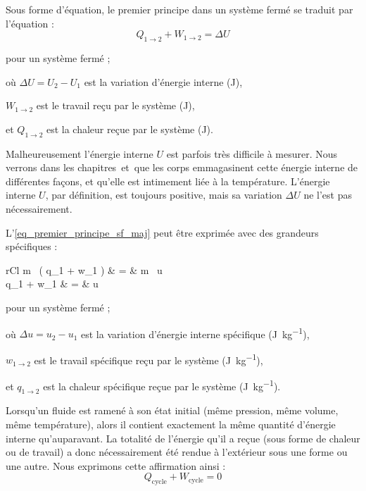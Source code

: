 	Sous forme d’équation, le premier principe dans un système fermé se traduit par l’équation :
	\begin{equation}
		Q_{1 \to 2} + W_{1 \to 2} = \Delta U
		\label{eq_premier_principe_sf_maj}
	\end{equation}

	\begin{equationterms}
		\item pour un système fermé ;
		\item où \tab $\Delta U = U_2 - U_1$ est la variation d’énergie interne (\si{\joule}),
		\item 	\tab $W_{1 \to 2}$ 	\tab est le travail reçu par le système (\si{\joule}),
		\item et \tab $Q_{1 \to 2}$ 	\tab est la chaleur reçue par le système (\si{\joule}).
	\end{equationterms}

	Malheureusement l’énergie interne $U$ est parfois très difficile à mesurer. Nous verrons dans les chapitres~\quatre et~\cinq que les corps emmagasinent cette énergie interne de différentes façons, et qu’elle est intimement liée à la température. L’énergie interne $U$, par définition, est toujours positive, mais sa variation $\Delta U$ ne l’est pas nécessairement.

	L’\cref{eq_premier_principe_sf_maj} peut être exprimée avec des grandeurs spécifiques :
	\begin{IEEEeqnarray}{rCl}
		m \ ( q_{1 } + w_{1 } )		& = & m \ \Delta u  \nonumber \\
		q_{1 } + w_{1 } 				& = & \Delta u
	\label{eq_premier_principe_sf_min}
	\end{IEEEeqnarray}
	
	\begin{equationterms}
		\item pour un système fermé ;
		\item où \tab $\Delta u = u_2 - u_1$ est la variation d’énergie interne spécifique (\si{\joule\per\kilogram}),
		\item 	\tab $w_{1 \to 2}$ 	\tab est le travail spécifique reçu par le système (\si{\joule\per\kilogram}),
		\item et \tab $q_{1 \to 2}$ 	\tab\tab est la chaleur spécifique reçue par le système (\si{\joule\per\kilogram}).
	\end{equationterms}

	Lorsqu’un fluide est ramené à son état initial (même pression, même volume, même température), alors il contient exactement la même quantité d’énergie interne qu’auparavant. La totalité de l’énergie qu’il a reçue (sous forme de chaleur ou de travail) a donc nécessairement été rendue à l’extérieur sous une forme ou une autre. Nous exprimons cette affirmation ainsi :
	\begin{equation}
	Q_{\text{cycle}} + W_{\text{cycle}} = 0
	\label{eq_premier_principe_cycle}
	\end{equation}
	
